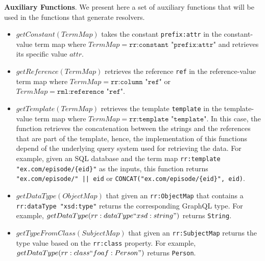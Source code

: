 \textbf{Auxiliary Functions}. We present here a set of auxiliary functions that will be used in the functions that generate resolvers.
\begin{itemize}
    \item $getConstant(TermMap)$ takes the constant \texttt{prefix:attr} in the constant-value term map where $TermMap = \texttt{rr:constant "prefix:attr"}$ and retrieves its specific value $attr$.
    \item $getReference(TermMap)$ retrieves the reference \texttt{ref} in the reference-value term map where $TermMap = \texttt{rr:column "ref"}$ or $TermMap = \texttt{rml:reference "ref"}$.
    \item $getTemplate(TermMap)$ retrieves the template \texttt{template} in the template-value term map where $TermMap = \texttt{rr:template "template"}$. In this case, the function retrieves the concatenation between the strings and the references that are part of the template, hence, the implementation of this functions depend of the underlying query system used for retrieving the data. For example, given an SQL database and the term map \texttt{rr:template "ex.com/episode/\{eid\}"} as the inputs, this function returns \texttt{"ex.com/episode/" || eid} or \texttt{CONCAT("ex.com/episode/\{eid\}", eid)}.%
    \item $getDataType(ObjectMap)$ that given an \texttt{rr:ObjectMap} that contains a \texttt{rr:dataType "xsd:type"} returns the corresponding GraphQL type. For example, $getDataType(rr:dataType ``xsd:string")$ returns \texttt{String}.
    \item $getTypeFromClass(SubjectMap)$ that given an \texttt{rr:SubjectMap} returns the type value based on the \texttt{rr:class} property. For example, $getDataType(rr:class ``foaf:Person")$ returns \texttt{Person}. 
\end{itemize}

